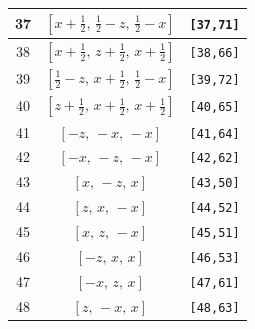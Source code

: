 \documentclass[fleqn,8pt]{jsarticle}
\begin{document}
\begin{longtable}{ccc}
37 & $\left[ x + \frac{1}{2},\, \frac{1}{2} - z,\, \frac{1}{2} - x \right]$ & {\tt [37,71]} \\ \hline
38 & $\left[ x + \frac{1}{2},\, z + \frac{1}{2},\, x + \frac{1}{2} \right]$ & {\tt [38,66]} \\ \hline
39 & $\left[ \frac{1}{2} - z,\, x + \frac{1}{2},\, \frac{1}{2} - x \right]$ & {\tt [39,72]} \\ \hline
40 & $\left[ z + \frac{1}{2},\, x + \frac{1}{2},\, x + \frac{1}{2} \right]$ & {\tt [40,65]} \\ \hline
41 & $\left[ - z,\, - x,\, - x \right]$ & {\tt [41,64]} \\ \hline
42 & $\left[ - x,\, - z,\, - x \right]$ & {\tt [42,62]} \\ \hline
43 & $\left[ x,\, - z,\, x \right]$ & {\tt [43,50]} \\ \hline
44 & $\left[ z,\, x,\, - x \right]$ & {\tt [44,52]} \\ \hline
45 & $\left[ x,\, z,\, - x \right]$ & {\tt [45,51]} \\ \hline
46 & $\left[ - z,\, x,\, x \right]$ & {\tt [46,53]} \\ \hline
47 & $\left[ - x,\, z,\, x \right]$ & {\tt [47,61]} \\ \hline
48 & $\left[ z,\, - x,\, x \right]$ & {\tt [48,63]} \\
\end{longtable}
\renewcommand{\arraystretch}{1.2}
\end{document}
